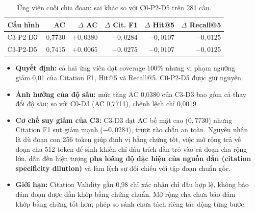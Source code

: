 \begin{table}[H]\centering\small{}
\caption{Ứng viên cuối chia đoạn: sai khác so với C0-P2-D5 trên 281 câu.}\label{tab:chunking-final}
\begin{tabular}{@{}lrrrrr@{}}\toprule
\textbf{Cấu hình} & \textbf{AC} & \textbf{$\Delta$ AC} & \textbf{$\Delta$ Cit. F1} & \textbf{$\Delta$ Hit@5} & \textbf{$\Delta$ Recall@5}\\\midrule
C3-P2-D3 & 0,7730 & $+0{,}0380$ & $-0{,}0284$ & $-0{,}0107$ & $-0{,}0125$\\
C3-P2-D5 & 0,7415 & $+0{,}0065$ & $-0{,}0275$ & $-0{,}0107$ & $-0{,}0125$\\\bottomrule
\end{tabular}
\end{table}
\begin{itemize}
\item \textbf{Quyết định:} cả hai ứng viên đạt coverage 100\% nhưng vi phạm ngưỡng giảm 0,01 của Citation F1, Hit@5 và Recall@5. C0-P2-D5 được giữ nguyên.
\item \textbf{Ảnh hưởng của độ sâu:} mức tăng AC 0,0380 của C3-D3 bao gồm cả thay đổi độ sâu; so với C0-D3 (AC 0,7711), chênh lệch chỉ 0,0019.
\item \textbf{Cơ chế suy giảm của C3:} C3-D3 đạt AC bề mặt cao ($0{,}7730$) nhưng Citation F1 sụt giảm mạnh ($-0{,}0284$), trượt rào chắn an toàn. Nguyên nhân là dù đoạn con 256 token giúp định vị bằng chứng tốt, việc mở rộng trả về đoạn cha 512 token để sinh khiến chỉ dấu trích dẫn \code{[1]} trỏ vào cả đoạn cha rộng lớn, dẫn đến hiện tượng \textbf{pha loãng độ đặc hiệu của nguồn dẫn (citation specificity dilution)} và làm lệch sự đối chiếu với tập đoạn chuẩn gốc.
\item \textbf{Giới hạn:} Citation Validity gần 0,98 chỉ xác nhận chỉ dấu hợp lệ, không bảo đảm đoạn được dẫn khớp bằng chứng chuẩn. Mở rộng cha chưa bảo đảm khớp bằng chứng tốt hơn; phép so sánh chưa tách riêng tác động từng bước.
\end{itemize}
